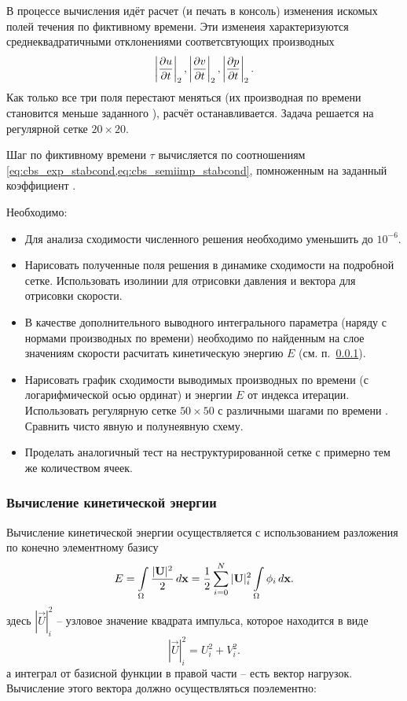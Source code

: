 В процессе вычисления идёт расчет (и печать в консоль) изменения искомых полей течения
по фиктивному времени. Эти изменеия характеризуются среднеквадратичными
отклонениями соответсвтующих производных
$$
\left|\frac{\partial u}{\partial t}\right|_2, \left|\frac{\partial v}{\partial t}\right|_2, \left|\frac{\partial p}{\partial t}\right|_2.
$$
Как только все три поля перестают меняться (их производная по времени
становится меньше заданного ), расчёт останавливается.
Задача решается на регулярной сетке $20\times20$.

Шаг по фиктивному времени $\tau$
вычисляется по соотношениям \cref{eq:cbs_exp_stabcond,eq:cbs_semiimp_stabcond},
помноженным на заданный коэффициент .

Необходимо:
\begin{itemize}
\item
Для анализа сходимости численного решения необходимо
уменьшить  до $10^{-6}$.
\item
Нарисовать полученные поля решения в динамике сходимости на подробной сетке. Использовать изолинии
для отрисовки давления и вектора для отрисовки скорости.
\item
В качестве дополнительного выводного интегрального параметра (наряду с нормами производных по времени)
необходимо по
найденным на слое значениям скорости 
расчитать кинетическую энергию $E$ (см. п.~\ref{seq:cbs_kinetic_e}).
\item
Нарисовать график сходимости выводимых производных по времени (с логарифмической осью ординат)
и энергии $E$ от индекса итерации. Использовать регулярную сетке $50\times50$ с различными шагами по времени .
Сравнить чисто явную и полунеявную схему.
\item
Проделать аналогичный тест на неструктурированной сетке  с примерно тем же количеством ячеек.
\end{itemize}

\subsubsection{Вычисление кинетической энергии}
\label{seq:cbs_kinetic_e}
Вычисление кинетической энергии
осуществляется с использованием
разложения по конечно элементному базису
\begin{equation}
\nonumber
E = \int\limits_{\Omega}\frac{|\boldsymbol{\rm U}|^2}{2} \, d \boldsymbol{\rm x} = \frac12\sum_{i=0}^{N}|\boldsymbol{\rm U}|^2_i \int\limits_{\Omega}\phi_i \, d \boldsymbol{\rm x}.
\end{equation}
здесь $|\vec U|^2_i$ -- узловое значение квадрата импульса, которое находится в виде
$$
|\vec U|^2_i = U_i^2 + V_i^2.
$$
а интеграл от базисной функции в правой части -- есть вектор нагрузок.
Вычисление этого вектора должно осуществляться поэлементно:


